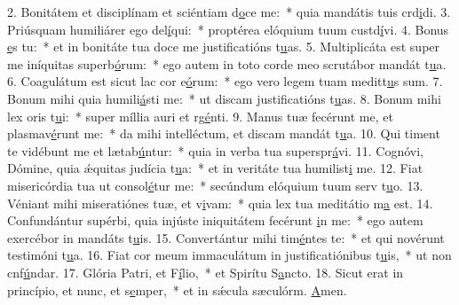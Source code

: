 2. Bonitátem et disciplínam et sciéntiam d\uline{o}ce me:~* quia mandátis tuis crd\uline{i}di.
3. Priúsquam humiliárer ego del\uline{í}qui:~* proptérea elóquium tuum custd\uline{í}vi.
4. Bonus \uline{e}s tu:~* et in bonitáte tua doce me justificatións t\uline{u}as.
5. Multiplicáta est super me iníquitas superb\uline{ó}rum:~* ego autem in toto corde meo scrutábor mandát t\uline{u}a.
6. Coagulátum est sicut lac cor e\uline{ó}rum:~* ego vero legem tuam meditt\uline{u}s sum.
7. Bonum mihi quia humili\uline{á}sti me:~* ut discam justificatións t\uline{u}as.
8. Bonum mihi lex oris t\uline{u}i:~* super míllia auri et rg\uline{é}nti.
9. Manus tuæ fecérunt me, et plasmav\uline{é}runt me:~* da mihi intelléctum, et discam mandát t\uline{u}a.
10. Qui timent te vidébunt me et lætab\uline{ú}ntur:~* quia in verba tua superspr\uline{á}vi.
11. Cognóvi, Dómine, quia ǽquitas judícia t\uline{u}a:~* et in veritáte tua humilist\uline{i} me.
12. Fiat misericórdia tua ut consol\uline{é}tur me:~* secúndum elóquium tuum serv t\uline{u}o.
13. Véniant mihi miseratiónes tuæ, et v\uline{i}vam:~* quia lex tua meditátio m\uline{a} est.
14. Confundántur supérbi, quia injúste iniquitátem fecérunt \uline{i}n me:~* ego autem exercébor in mandáts t\uline{u}is.
15. Convertántur mihi tim\uline{é}ntes te:~* et qui novérunt testimóni t\uline{u}a.
16. Fiat cor meum immaculátum in justificatiónibus t\uline{u}is,~* ut non cnf\uline{ú}ndar.
17. Glória Patri, et F\uline{í}lio,~* et Spirítu S\uline{a}ncto.
18. Sicut erat in princípio, et nunc, et s\uline{e}mper,~* et in sǽcula sæculórm. \uline{A}men.
